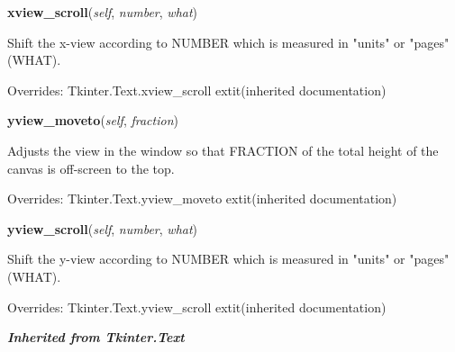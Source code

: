     \vspace{0.5ex}

\hspace{.8\funcindent}\begin{boxedminipage}{\funcwidth}

    \raggedright \textbf{xview\_scroll}(\textit{self}, \textit{number}, \textit{what})

\setlength{\parskip}{2ex}
    Shift the x-view according to NUMBER which is measured in "units" or 
    "pages" (WHAT).

\setlength{\parskip}{1ex}
      Overrides: Tkinter.Text.xview\_scroll 	extit{(inherited documentation)}

    \end{boxedminipage}

    \vspace{0.5ex}

\hspace{.8\funcindent}\begin{boxedminipage}{\funcwidth}

    \raggedright \textbf{yview\_moveto}(\textit{self}, \textit{fraction})

\setlength{\parskip}{2ex}
    Adjusts the view in the window so that FRACTION of the total height of 
    the canvas is off-screen to the top.

\setlength{\parskip}{1ex}
      Overrides: Tkinter.Text.yview\_moveto 	extit{(inherited documentation)}

    \end{boxedminipage}

    \vspace{0.5ex}

\hspace{.8\funcindent}\begin{boxedminipage}{\funcwidth}

    \raggedright \textbf{yview\_scroll}(\textit{self}, \textit{number}, \textit{what})

\setlength{\parskip}{2ex}
    Shift the y-view according to NUMBER which is measured in "units" or 
    "pages" (WHAT).

\setlength{\parskip}{1ex}
      Overrides: Tkinter.Text.yview\_scroll 	extit{(inherited documentation)}

    \end{boxedminipage}


\large{\textbf{\textit{Inherited from Tkinter.Text}}}

